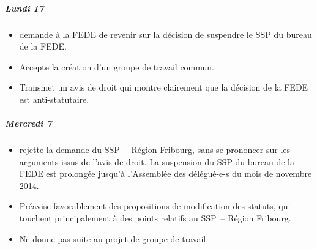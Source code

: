 \subparagraph{Lundi 17}%
\begin{itemize}
	\item demande à la FEDE de revenir sur la décision de suspendre le SSP du bureau de la FEDE.
	\item Accepte la création d'un groupe de travail commun.
	\item Transmet un avis de droit qui montre clairement que la décision de la FEDE est
		anti-statutaire.
\end{itemize}

\subparagraph{Mercredi 7}%
\begin{itemize}
	\item rejette la demande du SSP~– Région Fribourg,
			sans se prononcer sur les arguments issus de l'avis de droit.
		La suspension du SSP du bureau de la FEDE est prolongée jusqu'à l'Assemblée
		des délégué-e-s du mois de novembre 2014.
	\item Préavise favorablement des propositions de modification des statuts,
		qui touchent principalement à des points relatifs au SSP~– Région Fribourg.
	\item Ne donne pas suite au projet de groupe de travail.
\end{itemize}










